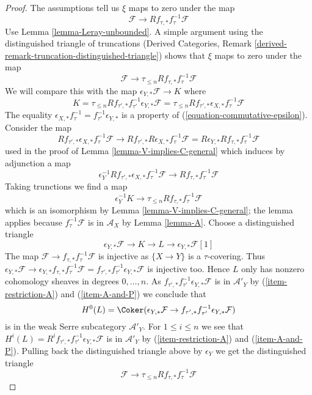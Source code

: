 \begin{proof}
\medskip\noindent
The assumptions tell us $\xi$ maps to zero under the map
$$
\mathcal{F} \longrightarrow Rf_{\tau, *}f_\tau^{-1}\mathcal{F}
$$
Use Lemma \ref{lemma-Leray-unbounded}.
A simple argument using the distinguished triangle of truncations
(Derived Categories, Remark
\ref{derived-remark-truncation-distinguished-triangle}) shows that
$\xi$ maps to zero under the map
$$
\mathcal{F} \longrightarrow \tau_{\leq n}Rf_{\tau, *}f_\tau^{-1}\mathcal{F}
$$
We will compare this with the map $\epsilon_{Y, *}\mathcal{F} \to K$
where
$$
K = \tau_{\leq n}Rf_{\tau', *}f_{\tau'}^{-1}\epsilon_{Y, *}\mathcal{F} =
\tau_{\leq n}Rf_{\tau', *}\epsilon_{X, *}f_{\tau}^{-1}\mathcal{F}
$$
The equality
$\epsilon_{X, *} f_\tau^{-1} = f_{\tau'}^{-1} \epsilon_{Y, *}$
is a property of (\ref{equation-commutative-epsilon}). Consider the map
$$
Rf_{\tau', *}\epsilon_{X, *}f_{\tau}^{-1}\mathcal{F} \longrightarrow
Rf_{\tau', *}R\epsilon_{X, *}f_{\tau}^{-1}\mathcal{F} =
R\epsilon_{Y, *}Rf_{\tau, *}f_\tau^{-1}\mathcal{F}
$$
used in the proof of Lemma \ref{lemma-V-implies-C-general}
which induces by adjunction a map
$$
\epsilon_Y^{-1} Rf_{\tau', *}\epsilon_{X, *}f_{\tau}^{-1}\mathcal{F} \to
Rf_{\tau, *}f_\tau^{-1}\mathcal{F}
$$
Taking trunctions we find a map
$$
\epsilon_Y^{-1}K
\longrightarrow
\tau_{\leq n}Rf_{\tau, *}f_\tau^{-1}\mathcal{F}
$$
which is an isomorphism by Lemma \ref{lemma-V-implies-C-general};
the lemma applies because $f_\tau^{-1}\mathcal{F}$ is in $\mathcal{A}_X$
by Lemma \ref{lemma-A}. Choose a distinguished triangle
$$
\epsilon_{Y, *}\mathcal{F} \to K \to L \to \epsilon_{Y, *}\mathcal{F}[1]
$$
The map $\mathcal{F} \to f_{\tau, *}f_\tau^{-1}\mathcal{F}$
is injective as $\{X \to Y\}$ is a $\tau$-covering. Thus
$\epsilon_{Y, *}\mathcal{F} \to
\epsilon_{Y, *}f_{\tau, *}f_\tau^{-1}\mathcal{F} =
f_{\tau', *}f_{\tau'}^{-1}\epsilon_{Y, *}\mathcal{F}$
is injective too. 
Hence $L$ only has nonzero cohomology sheaves in degrees $0, \ldots, n$.
As $f_{\tau', *}f_{\tau'}^{-1}\epsilon_{Y, *}\mathcal{F}$
is in $\mathcal{A}'_Y$ by (\ref{item-restriction-A}) and
(\ref{item-A-and-P}) we conclude that
$$
H^0(L) = \Coker(\epsilon_{Y, *}\mathcal{F} \to
f_{\tau', *}f_{\tau'}^{-1}\epsilon_{Y, *}\mathcal{F})
$$
is in the weak Serre subcategory $\mathcal{A}'_Y$. For $1 \leq i \leq n$
we see that $H^i(L) = R^if_{\tau', *}f_{\tau'}^{-1}\epsilon_{Y, *}\mathcal{F}$
is in $\mathcal{A}'_Y$ by (\ref{item-restriction-A}) and
(\ref{item-A-and-P}). Pulling back the distinguished triangle
above by $\epsilon_Y$ we get the distinguished triangle
$$
\mathcal{F} \to \tau_{\leq n}Rf_{\tau, *}f_\tau^{-1}\mathcal{F}
$$
\end{proof}
